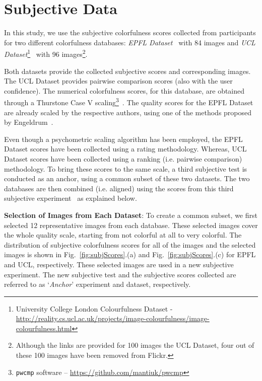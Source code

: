 \documentclass{article}
\begin{document}
%
 

\section{Subjective Data}
\label{sec:dataset}

In this study, we use the subjective colorfulness scores collected from participants for two different colorfulness databases: \textit{EPFL Dataset}~\cite{hasler2003measuring} with 84 images and \textit{UCL Dataset}\footnote{University College London Colourfulness Dataset - \url{http://reality.cs.ucl.ac.uk/projects/image-colourfulness/image-colourfulness.html}}~\cite{amati2014study} with 96 images\footnote{Although the links are provided for 100 images the UCL Dataset, four out of these 100 images have been removed from Flickr.}. 


Both datasets provide the collected subjective scores and corresponding images. The UCL Dataset provides pairwise comparison scores (also with the user confidence). The numerical colorfulness scores, for this database, are obtained through a Thurstone Case V scaling\footnote{\texttt{pwcmp} software -- \url{https://github.com/mantiuk/pwcmp}}~\cite{perezOrtiz2017practical}. The quality scores for the EPFL Dataset are already scaled by the respective authors, using one of the methods proposed by Engeldrum~\cite{engeldrum2000psychometric}.

Even though a psychometric scaling algorithm has been employed, the EPFL Dataset scores have been collected using a rating methodology. Whereas, UCL Dataset scores have been collected using a ranking (i.e. pairwise comparison) methodology. To bring these scores to the same scale, a third subjective test is conducted as an anchor, using a common subset of these two datasets. The two databases are then combined (i.e. aligned) using the scores from this third subjective experiment~\cite{pitrey2011aligning} as explained below.












\textbf{Selection of Images from Each Dataset}: 
To create a common subset, we first selected 12 representative images from each database. These selected images cover the whole quality scale, starting from not colorful at all to very colorful. The distribution of subjective colorfulness scores for all of the images and the selected images is shown in 
Fig.~\ref{fig:subjScores}.(a) and Fig.~\ref{fig:subjScores}.(c) 
for EPFL and UCL, respectively. These selected images are used in a new subjective experiment. The new subjective test and the subjective scores collected are referred to as `\textit{Anchor}' experiment and dataset, respectively. 
\end{document}
